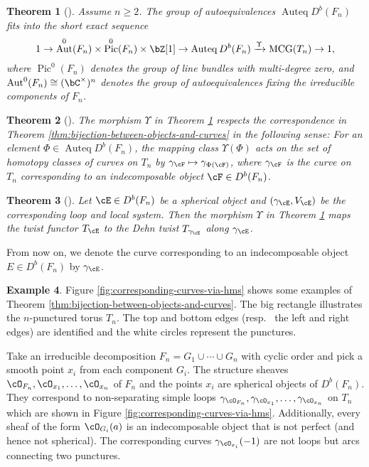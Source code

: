 \documentclass[12pt]{amsart}
\numberwithin{equation}{section}
\theoremstyle{plain}
\newtheorem{theorem}{Theorem}[section]
\theoremstyle{definition}
\newtheorem{example}[theorem]{Example}
\DeclareMathOperator{\Auteq}{\mathrm{Auteq}}
\DeclareMathOperator{\Pic}{\mathrm{Pic}}
\DeclareMathOperator{\MCG}{\mathrm{MCG}}
\DeclareMathOperator{\Aut}{\mathrm{Aut}}
\begin{document}
\begin{theorem}[{\cite[Theorem D]{2020arXiv201108288O}}]\label{thm:autoequivalence-of-I_n-curve}
    Assume $n \geq 2$.
    The group of autoequivalences $\Auteq{D^b(F_n)}$ fits into the short exact sequence
    \begin{equation}
        1 \to \Aut^0(F_n) \times \Pic^0(F_n) \times \bZ[1] \to \Auteq{D^b(F_n)} \xrightarrow{\Upsilon} \MCG(T_n) \to 1,
    \end{equation}
    where $\Pic^0(F_n)$ denotes the group of line bundles with multi-degree zero, and $\Aut^0(F_n) \cong (\bC^\times)^n$ denotes the group of autoequivalences fixing the irreducible components of $F_n$.
\end{theorem}
\begin{theorem}[{\cite[Corollary 7.37]{2020arXiv201108288O}}]\label{thm:definition-of-upsilon}
    The morphism $\Upsilon$ in Theorem \ref{thm:autoequivalence-of-I_n-curve} respects the correspondence in Theorem \ref{thm:bijection-between-objects-and-curves} in the following sense:
    For an element $\Phi \in \Auteq{D^b(F_n)}$, the mapping class $\Upsilon(\Phi)$ acts on the set of homotopy classes of curves on $T_n$ by $\gamma_{\cF} \mapsto \gamma_{\Phi(\cF)}$, where $\gamma_{\cF}$ is the curve on $T_n$ corresponding to an indecomposable object $\cF \in D^b(F_n)$.
\end{theorem}
\begin{theorem}[{\cite[Theorem 5.9]{2020arXiv201108288O}}]\label{thm:spherical-twist-and-dehn-twist}
    Let $\cE \in D^b(F_n)$ be a spherical object and $(\gamma_{\cE}, V_{\cE})$ be the corresponding loop and local system. Then the morphism $\Upsilon$ in Theorem \ref{thm:autoequivalence-of-I_n-curve} maps the twist functor $T_{\cE}$ to the Dehn twist $T_{\gamma_{\cE}}$ along $\gamma_{\cE}$.
\end{theorem}

From now on, we denote the curve corresponding to an indecomposable object $E \in D^b(F_n)$ by $\gamma_{\cE}$.


\begin{example}
    Figure \ref{fig:corresponding-curves-via-hms} shows some examples of Theorem \ref{thm:bijection-between-objects-and-curves}.
    The big rectangle illustrates the $n$-punctured torus $T_n$.
    The top and bottom edges (resp.~ the left and right edges) are identified and the white circles represent the punctures.

    Take an irreducible decomposition $F_n = G_1 \cup \cdots \cup G_n$ with cyclic order and pick a smooth point $x_i$ from each component $G_i$.
    The structure sheaves $\cO_{F_n}, \cO_{x_1}, \dots, \cO_{x_n}$ of $F_n$ and the points $x_i$ are spherical objects of $D^b(F_n)$.
    They correspond to non-separating simple loops $\gamma_{\cO_{F_n}}, \gamma_{\cO_{x_1}}, \dots, \gamma_{\cO_{x_n}}$ on $T_n$ which are shown in Figure \ref{fig:corresponding-curves-via-hms}.
    Additionally, every sheaf of the form $\cO_{G_i}(a)$ is an indecomposable object that is not perfect (and hence not spherical).
    The corresponding curves $\gamma_{\cO_{x_i}}(-1)$ are not loops but arcs connecting two punctures.
\end{example}
\end{document}
